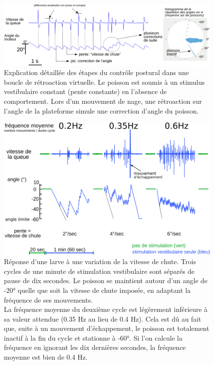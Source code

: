 \begin{figure}
    \centering
    \includegraphics[width=\textwidth]{./files/vestibular_feedback.svg.png}
    \caption{Explication détaillée des étapes du contrôle postural dans une boucle de rétroaction virtuelle. Le poisson est soumis à un stimulus vestibulaire constant (pente constante) en l'absence de comportement. Lors d'un mouvement de nage, une rétroaction sur l'angle de la plateforme simule une correction d'angle du poisson.
    \label{FIGvirtualposturalcontrol}}
    \end{figure}

    
\begin{figure}
    \centering
    \includegraphics[width=\textwidth]{./files/variation-vitesse.svg.png}
    \caption{
    Réponse d'une larve à une variation de la vitesse de chute. Trois cycles de une minute de stimulation vestibulaire sont séparés de pause de dix secondes. Le poisson se maintient autour d'un angle de -20° quelle que soit la vitesse de chute imposée, en adaptant la fréquence de ses mouvements.
    \\La fréquence moyenne du deuxième cycle est légèrement inférieure à sa valeur attendue (0.35 Hz au lieu de 0.4 Hz). Cela est dû au fait que, suite à un mouvement d'échappement, le poisson est totalement inactif à la fin du cycle et stationne à -60°. Si l'on calcule la fréquence en ignorant les dix dernières secondes, la fréquence moyenne est bien de 0.4 Hz.
    \label{FIGvariationvitesse}}
    \end{figure}


